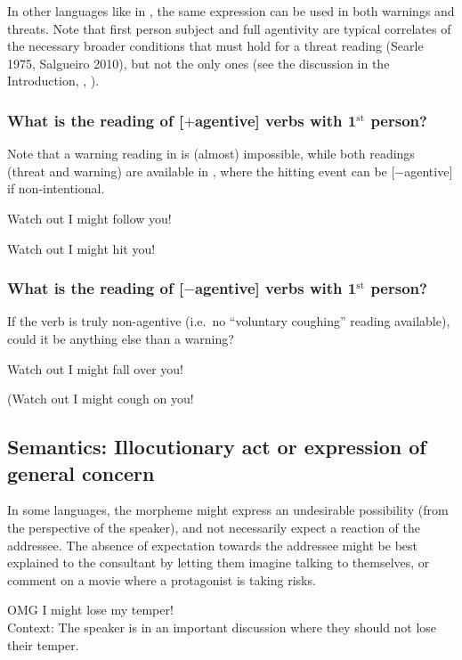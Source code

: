\documentclass[output=paper,colorlinks,citecolor=brown]{langscibook}
\begin{document}
In other languages like in  \citep[274]{vuillermet2018a}, the same expression can be used in both warnings and threats. Note that first person subject and full agentivity are typical correlates of the necessary broader conditions that must hold for a threat reading (Searle 1975, Salgueiro 2010), but not the only ones (see the discussion in the Introduction, , \citealt{chapters/introduction}).


\subsubsection{What is the reading of [$+$agentive] verbs with 1$\mathrm{^{st}}$ person?}

Note that a warning reading in  is (almost) impossible, while both readings (threat and warning) are available in , where the hitting event can be [$-$agentive] if non-intentional.
\label{1.4.1}

\ea \label{p16} {\op}Watch out{\cp} I might follow you!
\z

\ea \label{p17} {\op}Watch out{\cp} I might hit you!
\z

\subsubsection{What is the reading of [$-$agentive] verbs with 1$\mathrm{^{st}}$ person?}
If the verb is truly non-agentive (i.e.\ no ``voluntary coughing'' reading available), could it be anything else than a warning?
\label{1.4.2}

\ea \label{p18} {\op}Watch out{\cp} I might fall {\op}over you{\cp}!
\z

\ea \label{p19}(Watch out{\cp} I might cough {\op}on you{\cp}!
\z


\subsection{Semantics: Illocutionary act or expression of general concern}
\label{subsec:apprsemantics}

In some languages, the morpheme might express an undesirable possibility (from the perspective of the speaker), and not necessarily expect a reaction of the addressee. The absence of expectation towards the addressee might be best explained to the consultant by letting them imagine talking to themselves, or comment on a movie where a protagonist is taking risks.

\ea \label{p20} {\op}OMG{\cp} I might lose my temper! \\
\textnormal{Context: The speaker is in an important discussion where they should not lose their temper.}
\z
\end{document}
